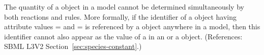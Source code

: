 The quantity of a \Species object in a model cannot be determined
simultaneously by both reactions and rules.  More formally, if the
identifier of a \Species object having attribute values
= and = is
referenced by a \SpeciesReference object anywhere in a model, then this
identifier cannot also appear as the value of a  in an
\AssignmentRule or a \RateRule object.  (References: SBML L3V2
Section~\ref{sec:species-constant}.)
